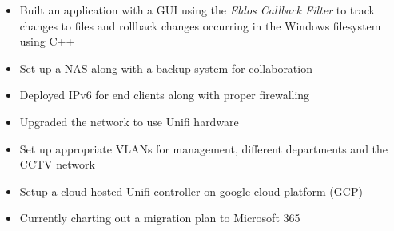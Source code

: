 \documentclass[10pt,a4paper]{altacv}
\begin{document}
\begin{itemize}
    \item Built an application with a GUI using the \emph{Eldos Callback Filter} to track changes to files and rollback changes occurring in the Windows filesystem using C++
\end{itemize}
\divider


\begin{itemize}
    \item Set up a NAS along with a backup system for collaboration
    \item Deployed IPv6 for end clients along with proper firewalling
    \item Upgraded the network to use Unifi hardware
    \item Set up appropriate VLANs for management, different departments and the CCTV network
    \item Setup a cloud hosted Unifi controller on google cloud platform (GCP)
    \item Currently charting out a migration plan to Microsoft 365
\end{itemize}
\end{document}
